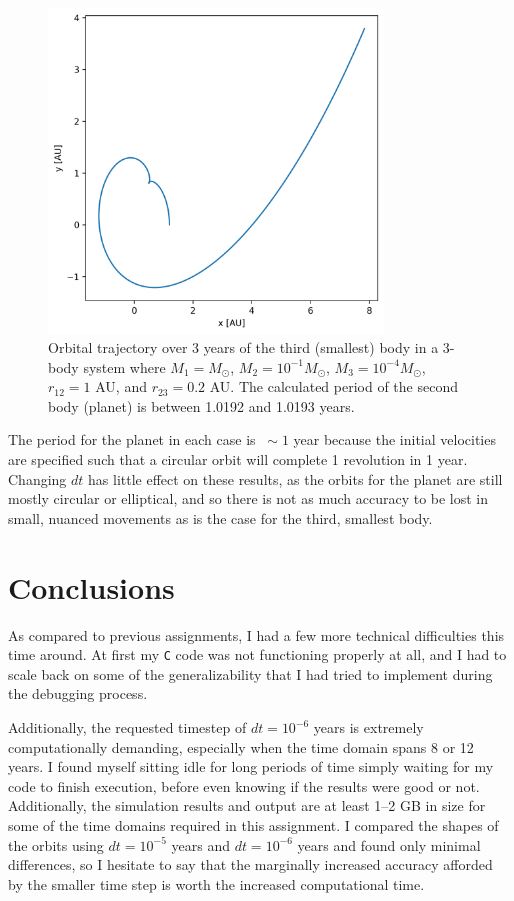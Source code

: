 \documentclass{article}
\begin{document}
\begin{figure}[!h]
    \centering
    \includegraphics[width=3.5in]{homework4/1-4.png}
    \caption{Orbital trajectory over 3 years of the third (smallest) body in a 3-body system where $M_1=M_\odot$, $M_2=10^{-1}M_\odot$, $M_3 = 10^{-4}M_\odot$, $r_{12}=1$ AU, and $r_{23}= 0.2$ AU. The calculated period of the second body (planet) is between 1.0192 and 1.0193 years.}
    \label{fig:1-4}
\end{figure}

The period for the planet in each case is $\ \sim 1$ year because the initial velocities are specified such that a circular orbit will complete 1 revolution in 1 year. Changing $dt$ has little effect on these results, as the orbits for the planet are still mostly circular or elliptical, and so there is not as much accuracy to be lost in small, nuanced movements as is the case for the third, smallest body.

\section{Conclusions}

As compared to previous assignments, I had a few more technical difficulties this time around. At first my \texttt{C} code was not functioning properly at all, and I had to scale back on some of the generalizability that I had tried to implement during the debugging process.

Additionally, the requested timestep of $dt=10^{-6}$ years is extremely computationally demanding, especially when the time domain spans 8 or 12 years. I found myself sitting idle for long periods of time simply waiting for my code to finish execution, before even knowing if the results were good or not. Additionally, the simulation results and output are at least 1--2 GB in size for some of the time domains required in this assignment. I compared the shapes of the orbits using $dt=10^{-5}$ years and $dt=10^{-6}$ years and found only minimal differences, so I hesitate to say that the marginally increased accuracy afforded by the smaller time step is worth the increased computational time.
\end{document}
